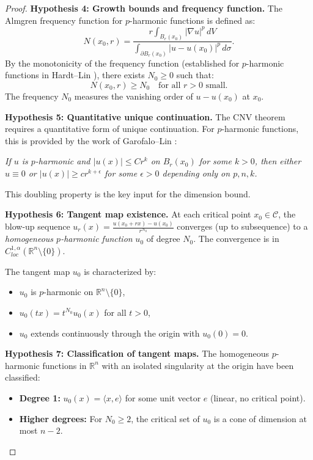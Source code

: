 \begin{proof}
\textbf{Hypothesis 4: Growth bounds and frequency function.}
The Almgren frequency function for $p$-harmonic functions is defined as:
\begin{equation}
    N(x_0, r) = \frac{r \int_{B_r(x_0)} |\nabla u|^p \, dV}{\int_{\partial B_r(x_0)} |u - u(x_0)|^p \, d\sigma}.
\end{equation}
By the monotonicity of the frequency function (established for $p$-harmonic functions in Hardt--Lin \cite{hardtlin1987}), there exists $N_0 \ge 0$ such that:
\begin{equation}
    N(x_0, r) \ge N_0 \quad \text{for all } r > 0 \text{ small}.
\end{equation}
The frequency $N_0$ measures the vanishing order of $u - u(x_0)$ at $x_0$.

\textbf{Hypothesis 5: Quantitative unique continuation.}
The CNV theorem requires a quantitative form of unique continuation. For $p$-harmonic functions, this is provided by the work of Garofalo--Lin \cite{garofalolin1987}:

\textit{If $u$ is $p$-harmonic and $|u(x)| \le C r^k$ on $B_r(x_0)$ for some $k > 0$, then either $u \equiv 0$ or $|u(x)| \ge c r^{k+\epsilon}$ for some $\epsilon > 0$ depending only on $p, n, k$.}

This doubling property is the key input for the dimension bound.

\textbf{Hypothesis 6: Tangent map existence.}
At each critical point $x_0 \in \mathcal{C}$, the blow-up sequence $u_r(x) = \frac{u(x_0 + rx) - u(x_0)}{r^{N_0}}$ converges (up to subsequence) to a \emph{homogeneous $p$-harmonic function} $u_0$ of degree $N_0$. The convergence is in $C^{1,\alpha}_{loc}(\mathbb{R}^n \setminus \{0\})$.

The tangent map $u_0$ is characterized by:
\begin{itemize}
    \item $u_0$ is $p$-harmonic on $\mathbb{R}^n \setminus \{0\}$,
    \item $u_0(tx) = t^{N_0} u_0(x)$ for all $t > 0$,
    \item $u_0$ extends continuously through the origin with $u_0(0) = 0$.
\end{itemize}

\textbf{Hypothesis 7: Classification of tangent maps.}
The homogeneous $p$-harmonic functions in $\mathbb{R}^n$ with an isolated singularity at the origin have been classified:
\begin{itemize}
    \item \textbf{Degree 1:} $u_0(x) = \langle x, e \rangle$ for some unit vector $e$ (linear, no critical point).
    \item \textbf{Higher degrees:} For $N_0 \ge 2$, the critical set of $u_0$ is a cone of dimension at most $n-2$.
\end{itemize}


\end{proof}
